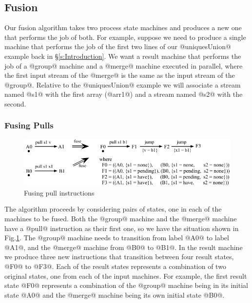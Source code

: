 

\clearpage{}
\subsection{Fusion}
Our fusion algorithm takes two process state machines and produces a new one that performs the job of both. For example, suppose we need to produce a single machine that performs the job of the first two lines of our @uniquesUnion@ example back in \S\ref{s:Introduction}. We want a result machine that performs the job of a @group@ machine and a @merge@ machine executed in parallel, where the first input stream of the @merge@ is the same as the input stream of the @group@. Relative to the @uniquesUnion@ example we will associate a stream named @s1@ with the first array (@arr1@) and a stream named @s2@ with the second. 


\subsubsection{Fusing Pulls}
\begin{figure}
\includegraphics[scale=1.1]{figures/fuse-pull-pull.pdf}
\caption{Fusing pull instructions}
\label{fig:Fusion:Pulls}
\end{figure}

The algorithm proceeds by considering pairs of states, one in each of the machines to be fused. Both the @group@ machine and the @merge@ machine have a @pull@ instruction as their first one, so we have the situation shown in Fig.\ref{fig:Fusion:Pulls}. The @group@ machine needs to transition from label @A0@ to label @A1@, and the @merge@ machine from @B0@ to @B1@. In the result machine we produce three new instructions that transition between four result states, @F0@ to @F3@. Each of the result states represents a combination of two original states, one from each of the input machines. For example, the first result state @F0@ represents a combination of the @group@ machine being in its initial state @A0@ and the @merge@ machine being its own initial state @B0@. 

